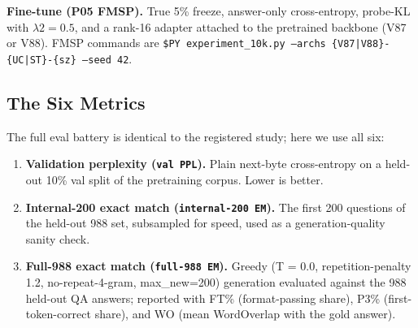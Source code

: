 \documentclass[11pt]{article}
\begin{document}
\textbf{Fine-tune (P05 FMSP).} True 5\% freeze, answer-only cross-entropy, probe-KL with $\lambda 2 = 0.5$, and a rank-16 adapter attached to the pretrained backbone (V87 or V88). FMSP commands are \texttt{\$PY experiment\_10k.py --archs \{V87|V88\}-\{UC|ST\}-\{sz\} --seed 42}.

\subsection{The Six Metrics}

The full eval battery is identical to the registered study; here we use all six:

\begin{enumerate}
  \item \textbf{Validation perplexity (\texttt{val PPL}).} Plain next-byte cross-entropy on a held-out 10\% val split of the pretraining corpus. Lower is better.
  \item \textbf{Internal-200 exact match (\texttt{internal-200 EM}).} The first 200 questions of the held-out 988 set, subsampled for speed, used as a generation-quality sanity check.
  \item \textbf{Full-988 exact match (\texttt{full-988 EM}).} Greedy (T = 0.0, repetition-penalty 1.2, no-repeat-4-gram, max\_new=200) generation evaluated against the 988 held-out QA answers; reported with FT\% (format-passing share), P3\% (first-token-correct share), and WO (mean WordOverlap with the gold answer).

\end{enumerate}
\end{document}
